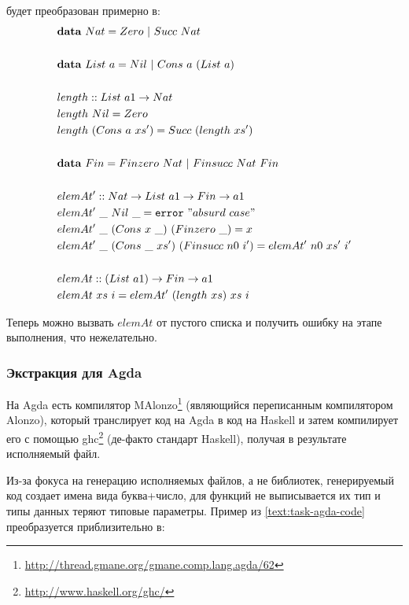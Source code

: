 будет преобразован примерно в:
\begin{align*}
&\mathbf{data}\ Nat = Zero\ |\ Succ\ Nat\\
\\
&\mathbf{data}\ List\ a = Nil\ |\ Cons\ a\ (List\ a)\\
\\
&length :: List\ a1 \rightarrow Nat\\
&length\ Nil = Zero\\
&length\ (Cons\ a\ xs') = Succ\ (length\ xs')\\
\\
&\mathbf{data}\ Fin = Finzero\ Nat\ |\ Finsucc\ Nat\ Fin\\
\\
&elemAt' :: Nat \rightarrow List\ a1 \rightarrow Fin \rightarrow a1\\
&elemAt'\ \_\ Nil\ \_ = \texttt{error}\ "absurd\ case"\\
&elemAt'\ \_\ (Cons\ x\ \_)\ (Finzero\ \_) = x\\
&elemAt'\ \_\ (Cons\ \_\ xs')\ (Finsucc\ n0\ i') = elemAt'\ n0\ xs'\ i'\\
\\
&elemAt :: (List\ a1) \rightarrow Fin \rightarrow a1\\
&elemAt\ xs\ i = elemAt'\ (length\ xs)\ xs\ i
\end{align*}

Теперь можно вызвать \(elemAt\) от пустого списка и получить ошибку на
этапе выполнения, что нежелательно.

\subsubsection{Экстракция для Agda}

На Agda есть компилятор
MAlonzo\footnote{\url{http://thread.gmane.org/gmane.comp.lang.agda/62}}
(являющийся переписанным компилятором Alonzo\cite{Ben07}), который транслирует
код на Agda в код на Haskell и затем компилирует его с помощью
ghc\footnote{\url{http://www.haskell.org/ghc/}} (де-факто стандарт Haskell),
получая в результате исполняемый файл.

Из-за фокуса на генерацию исполняемых файлов, а не библиотек,
генерируемый код создает имена вида буква+число, для функций
не выписывается их тип и типы данных теряют типовые параметры.
Пример из \ref{text:task-agda-code} преобразуется приблизительно в:

